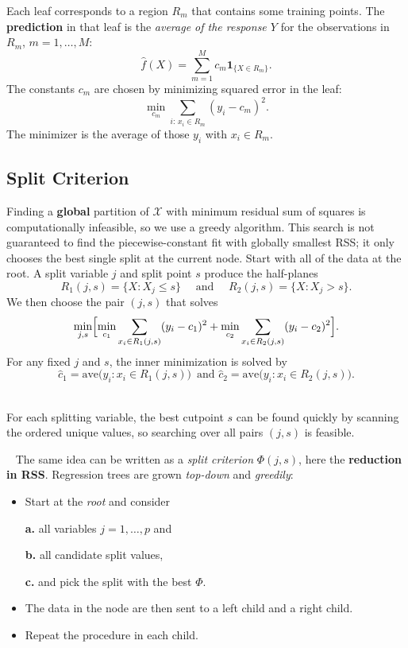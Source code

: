 \documentclass[
]{book}
\begin{document}
Each leaf corresponds to a region \(R_m\) that contains some training points. The \textbf{prediction} in that leaf is the \emph{average of the response \(Y\)} for the observations in \(R_m\), \(m=1, \ldots, M\):
\[\hat{f}(X) = \sum_{m=1}^{M} c_m \mathbf{1}_{\{ X \in R_m\}}.\]
The constants \(c_m\) are chosen by minimizing squared error in the leaf:
\[\min_{c_m} \sum_{i:\, x_i \in R_m} (y_i - c_m)^2.\]
The minimizer is the average of those \(y_i\) with \(x_i \in R_m\).
~

\subsection{Split Criterion}\label{split-criterion}

Finding a \textbf{global} partition of \(\mathcal{X}\) with minimum residual sum of squares is computationally infeasible, so we use a greedy algorithm. This search is not guaranteed to find the piecewise-constant fit with globally smallest RSS; it only chooses the best single split at the current node. Start with all of the data at the root. A split variable \(j\) and split point \(s\) produce the half-planes
\[R_1 (j,s) = \bigl\{X: X_j \leq s \bigr\} \quad \text{ and } \quad R_2 (j,s) = \bigl\{X: X_j > s \bigr\}.\]
We then choose the pair \((j,s)\) that solves
\[\min_{j,s} \Bigl[ \min_{c_1} \sum_{x_i \in R_1(j,s)} (y_i - c_1)^2 + \min_{c_2} \sum_{x_i \in R_2(j,s)} (y_i - c_2)^2 \Bigr].\]
For any fixed \(j\) and \(s\), the inner minimization is solved by
\[ \hat{c}_1 = \mathrm{ave} \bigl(y_i : x_i \in R_1(j,s) \bigr) \, \text{ and }  \hat{c}_2 = \mathrm{ave} \bigl(y_i : x_i \in R_2(j,s) \bigr).\]
~

For each splitting variable, the best cutpoint \(s\) can be found quickly by scanning the ordered unique values, so searching over all pairs \((j,s)\) is feasible.

~
The same idea can be written as a \emph{split criterion} \(\Phi(j,s)\), here the \textbf{reduction in RSS}. Regression trees are grown \emph{top-down} and \emph{greedily}:

\begin{itemize}
\item
  Start at the \emph{root} and consider

  \textbf{a.} all variables \(j=1, \ldots, p\) and

  \textbf{b.} all candidate split values,

  \textbf{c.} and pick the split with the best \(\Phi\).
\item
  The data in the node are then sent to a left child and a right child.
\item
  Repeat the procedure in each child.
\end{itemize}
\end{document}
